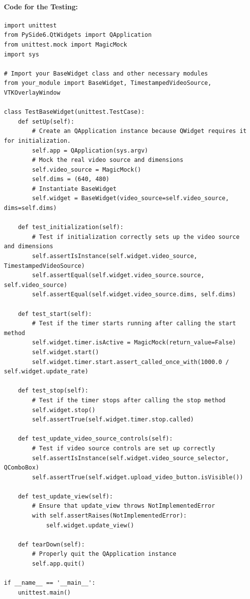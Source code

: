 \documentclass[12pt]{article}
\begin{document}
\paragraph{Code for the Testing:}
\begin{verbatim}
import unittest
from PySide6.QtWidgets import QApplication
from unittest.mock import MagicMock
import sys

# Import your BaseWidget class and other necessary modules
from your_module import BaseWidget, TimestampedVideoSource, VTKOverlayWindow

class TestBaseWidget(unittest.TestCase):
    def setUp(self):
        # Create an QApplication instance because QWidget requires it for initialization.
        self.app = QApplication(sys.argv)
        # Mock the real video source and dimensions
        self.video_source = MagicMock()
        self.dims = (640, 480)
        # Instantiate BaseWidget
        self.widget = BaseWidget(video_source=self.video_source, dims=self.dims)

    def test_initialization(self):
        # Test if initialization correctly sets up the video source and dimensions
        self.assertIsInstance(self.widget.video_source, TimestampedVideoSource)
        self.assertEqual(self.widget.video_source.source, self.video_source)
        self.assertEqual(self.widget.video_source.dims, self.dims)

    def test_start(self):
        # Test if the timer starts running after calling the start method
        self.widget.timer.isActive = MagicMock(return_value=False)
        self.widget.start()
        self.widget.timer.start.assert_called_once_with(1000.0 / self.widget.update_rate)

    def test_stop(self):
        # Test if the timer stops after calling the stop method
        self.widget.stop()
        self.assertTrue(self.widget.timer.stop.called)

    def test_update_video_source_controls(self):
        # Test if video source controls are set up correctly
        self.assertIsInstance(self.widget.video_source_selector, QComboBox)
        self.assertTrue(self.widget.upload_video_button.isVisible())

    def test_update_view(self):
        # Ensure that update_view throws NotImplementedError
        with self.assertRaises(NotImplementedError):
            self.widget.update_view()

    def tearDown(self):
        # Properly quit the QApplication instance
        self.app.quit()

if __name__ == '__main__':
    unittest.main()
\end{verbatim}
\end{document}
